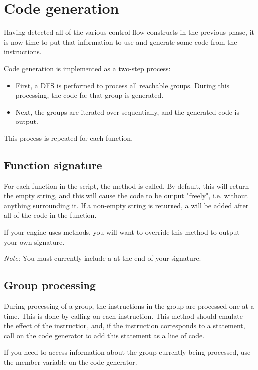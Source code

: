 \section{Code generation}
\label{sec:codegen}

Having detected all of the various control flow constructs in the previous phase, it is now time to put that information to use and generate some code from the instructions.

Code generation is implemented as a two-step process:
\begin{itemize}
\item First, a DFS is performed to process all reachable groups. During this processing, the code for that group is generated.
\item Next, the groups are iterated over sequentially, and the generated code is output.
\end{itemize}

This process is repeated for each function.

\subsection{Function signature}
For each function in the script, the  method is called. By default, this will return the empty string, and this will cause the code to be output "freely", i.e. without anything surrounding it. If a non-empty string is returned, a \code{\}} will be added after all of the code in the function.

If your engine uses methods, you will want to override this method to output your own signature.

\emph{Note:} You must currently include a \code{\{} at the end of your signature.

\subsection{Group processing}
During processing of a group, the instructions in the group are processed one at a time. This is done by calling  on each instruction. This method should emulate the effect of the instruction, and, if the instruction corresponds to a statement, call  on the code generator to add this statement as a line of code.

If you need to access information about the group currently being processed, use the member variable  on the code generator.


